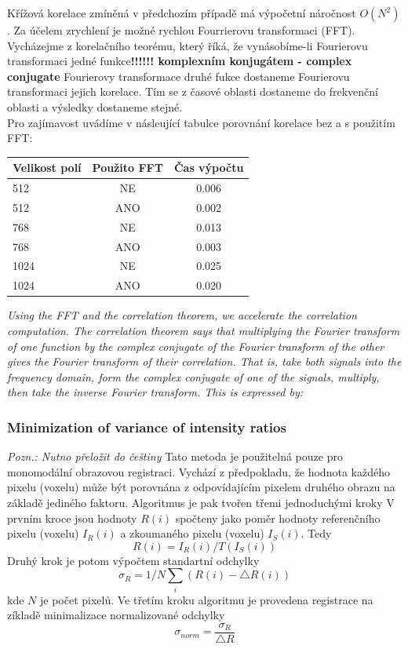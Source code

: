 \documentclass{thesis}%
\begin{document}
Křížová korelace zmíněná v předchozím případě má výpočetní náročnost $O(N^2)$. Za účelem zrychlení je možné rychlou Fourrierovu transformaci (FFT). Vycházejme z korelačního teorému, který říká, že vynásobíme-li Fourierovu transformaci jedné funkce\textbf{!!!!!! komplexním konjugátem - complex conjugate } Fourierovy transformace druhé fukce dostaneme Fourierovu transformaci jejich korelace. Tím se z časové oblasti dostaneme do frekvenční oblasti a výsledky dostaneme stejné.\\
Pro zajímavost uvádíme v násleující tabulce porovnání korelace bez a s použitím FFT:
\begin{center}
\begin{tabular}{l|c|c}
 \centering
\bfseries \bfseries Velikost polí & \bfseries Použito FFT & \bfseries Čas výpočtu\\
\hline \hline
512                     &NE& 0.006\\
512                     &ANO& 0.002\\
768                     &NE& 0.013\\
768                     &ANO& 0.003\\
1024                   &NE& 0.025\\
1024                   &ANO& 0.020\\
\end{tabular}
\end{center}

\textit{Using the FFT and the correlation theorem, we accelerate the correlation
computation. The correlation theorem says that multiplying the Fourier transform of
one function by the complex conjugate of the Fourier transform of the other gives the
Fourier transform of their correlation. That is, take both signals into the frequency
domain, form the complex conjugate of one of the signals, multiply, then take the
inverse Fourier transform. This is expressed by: }
\subsubsection{Minimization of variance of intensity ratios}
\textit{Pozn.: Nutno přeložit do češtiny}
Tato metoda je použitelná pouze pro monomodální obrazovou registraci. Vychází z předpokladu, že hodnota každého pixelu (voxelu) může být porovnána z odpovídajícím pixelem druhého obrazu na základě jediného faktoru. Algoritmus je pak tvořen třemi jednoduchými kroky V prvním kroce jsou hodnoty $R(i)$ spočteny jako poměr hodnoty referenčního pixelu (voxelu) $I_R(i)$ a zkoumaného pixelu (voxelu) $I_S(i)$. Tedy
\begin{equation}
 R(i)= I_R(i)/T(I_S(i))
\end{equation}
Druhý krok je potom výpočtem standartní odchylky
\begin{equation}
\sigma_R = 1/N\sum\limits_ {i}(R(i)- \bigtriangleup R(i))
\end{equation}
 kde $N$ je počet pixelů. Ve třetím kroku algoritmu je provedena registrace na zíkladě minimalizace normalizované odchylky 
\begin{equation}
 \sigma_{norm} = \frac{\sigma_R}{\bigtriangleup R}
\end{equation}
\end{document}
